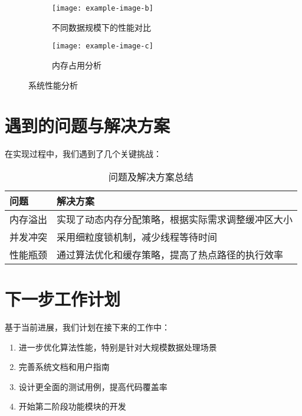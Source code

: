 \documentclass{article}
\begin{document}
\begin{figure}[h]
\centering
\begin{subfigure}{0.48\textwidth}
\centering
\texttt{[image: example-image-b]}
\caption{不同数据规模下的性能对比}
\label{fig:scale_performance}
\end{subfigure}
\hfill
\begin{subfigure}{0.48\textwidth}
\centering
\texttt{[image: example-image-c]}
\caption{内存占用分析}
\label{fig:memory_usage}
\end{subfigure}
\caption{系统性能分析}
\label{fig:performance_comparison}
\end{figure}

\section{遇到的问题与解决方案}

在实现过程中，我们遇到了几个关键挑战：

\begin{table}[h]
\centering
\begin{tabular}{|p{}|p{}|}
\hline
\textbf{问题} & \textbf{解决方案} \\
\hline
内存溢出 & 实现了动态内存分配策略，根据实际需求调整缓冲区大小 \\
\hline
并发冲突 & 采用细粒度锁机制，减少线程等待时间 \\
\hline
性能瓶颈 & 通过算法优化和缓存策略，提高了热点路径的执行效率 \\
\hline
\end{tabular}
\caption{问题及解决方案总结}
\label{tab:problems_solutions}
\end{table}

\section{下一步工作计划}

基于当前进展，我们计划在接下来的工作中：

\begin{enumerate}
\item 进一步优化算法性能，特别是针对大规模数据处理场景
\item 完善系统文档和用户指南
\item 设计更全面的测试用例，提高代码覆盖率
\item 开始第二阶段功能模块的开发
\end{enumerate}



\end{document}
